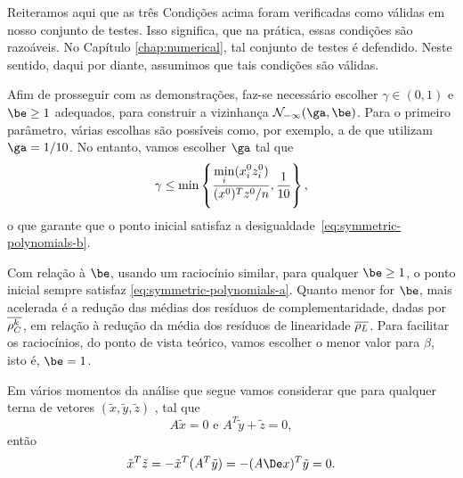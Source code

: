 Reiteramos aqui que  as três Condições acima foram verificadas como válidas em nosso conjunto de testes. Isso significa, que na prática, essas condições são razoáveis. No Capítulo \ref{chap:numerical}, tal conjunto de testes é defendido. Neste sentido, daqui por diante, assumimos que tais condições são válidas. 






Afim de prosseguir com as demonstrações, faz-se necessário  escolher  $\gamma\in(0,1)$  e $\be\geq 1$ adequados, para construir a vizinhança $\Nset_{-\infty}(\ga,\be)$. Para o primeiro parâmetro, várias escolhas são possíveis como, por exemplo, a de 
\textcite{Colombo:2008ia} que utilizam $\ga = 1/10$. No entanto, vamos escolher $\ga$ tal que  
\[
\gamma \leq  \min\left\{ \frac{\displaystyle \min_{i}(x^0_{i} z^0_{i} )}{(x^0 )^Tz^0 /n}, \frac{1}{10}\right\},
\]
o que garante que o ponto inicial satisfaz a desigualdade~\eqref{eq:symmetric-polynomials-b}.

Com relação à $\be$,  usando um raciocínio similar, para qualquer  $\be\geq 1$, o ponto inicial sempre satisfaz \eqref{eq:symmetric-polynomials-a}. Quanto menor for $\be$, mais acelerada é a redução  das médias dos resíduos de complementaridade, dadas por $\overline{\rho_C^k }$, em relação à redução da média dos resíduos de linearidade $\overline{\rho_L}$. Para facilitar os raciocínios, do ponto de vista teórico, vamos escolher o menor valor para $\beta$, isto é, $\be=1$.


\begin{obs}
	Em vários momentos da análise que segue vamos considerar que para qualquer terna de vetores $(\tilde{x},\tilde{y},\tilde{z})$ ,  tal que 
\begin{equation}
	\label{eq:Ax0-ATyz0}
	A\tilde{x}=0 \text{ e } A^T\tilde{y} + \tilde{z} = 0,
\end{equation}
então
\begin{equation}
	\label{eq:xTziszero}
	\tilde{x}^T\tilde{z} =  - \tilde{x}^T(A^T\tilde{y})  = -(A\Dex)^T\tilde{y} = 0.
\end{equation}
\end{obs}



